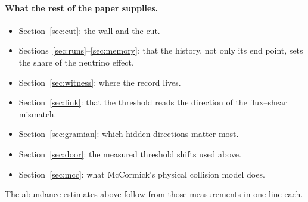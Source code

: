 \paragraph{What the rest of the paper supplies.}
\begin{itemize}
\item Section~\ref{sec:cut}: the wall and the cut.
\item Sections~\ref{sec:runs}--\ref{sec:memory}: that the history, not only its end point, sets the share of the neutrino effect.
\item Section~\ref{sec:witness}: where the record lives.
\item Section~\ref{sec:link}: that the threshold reads the direction of the flux--shear mismatch.
\item Section~\ref{sec:gramian}: which hidden directions matter most.
\item Section~\ref{sec:door}: the measured threshold shifts used above.
\item Section~\ref{sec:mcc}: what McCormick's physical collision model does.
\end{itemize}
The abundance estimates above follow from those measurements in one line each.
